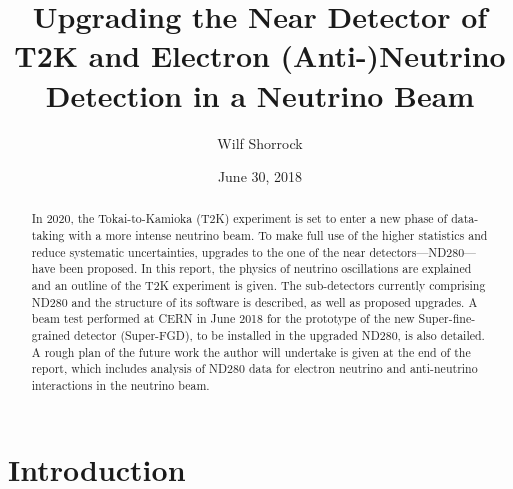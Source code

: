 \documentclass[aps,pra,12pt,notitlepage,tightenlines]{revtex4-1}
\begin{document}
\title{Upgrading the Near Detector of T2K and Electron \mbox{(Anti-)Neutrino} Detection in a Neutrino Beam \vspace{0mm}}
\author{Wilf Shorrock\vspace{1mm}}
\date{June 30, 2018}
\begin{abstract}
\linespread{0.97}
\vspace{1mm} In 2020, the Tokai-to-Kamioka (T2K) experiment is set to enter a new phase of data-taking with a more intense neutrino beam. To make full use of the higher statistics and reduce systematic uncertainties, upgrades to the one of the near detectors---ND280---have been proposed. In this report, the physics of neutrino oscillations are explained and an outline of the T2K experiment is given. The sub-detectors currently comprising ND280 and the structure of its software is described, as well as proposed upgrades. A beam test performed at CERN in June 2018 for the prototype of the new Super-fine-grained detector (Super-FGD), to be installed in the upgraded ND280, is also detailed. A rough plan of the future work the author will undertake is given at the end of the report, which includes analysis of ND280 data for electron neutrino and anti-neutrino interactions in the neutrino beam.
\end{abstract}

\maketitle

\newpage
\tableofcontents
\newpage

\vspace{-8mm}

\section{Introduction}
\end{document}
